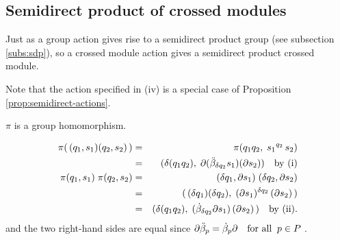 
\subsection{Semidirect product of crossed modules} 
\label{subs:sdp-xmod}

Just as a group action gives rise to a semidirect product group 
(see subsection \ref{subs:sdp}),
so a crossed module action gives a semidirect product crossed module.

Note that the action specified in (iv) is a special case of 
Proposition \ref{prop:semidirect-actions}.

\begin{lem}
$\pi$ is a group homomorphism.
\end{lem}
\begin{pf}
\begin{eqnarray*}
\pi(\,(q_1,s_1)(q_2,s_2)\,)  &  =  &
   \pi( q_1q_2,\; {s_1}^{q_2}\,s_2)  \\
 & = &
   (\delta (q_1 q_2),\; 
      \partial(\ddot{\beta}_{\delta q_2}s_1)(\partial s_2) ) \quad \mbox{by (i)} \\
\pi(q_1,s_1)\;\pi(q_2,s_2)  & = &
   (\delta q_1, \partial s_1)\;(\delta q_2, \partial s_2)  \\
 & = &
   (\,(\delta q_1)(\delta q_2),\;
      (\partial s_1)^{\delta q_2}\,(\partial s_2)\,) \\
 & = &
   (\delta(q_1q_2),\; (\dot{\beta}_{\delta q_2} \partial s_1)\,(\partial s_2)\,)
       \quad \mbox{by (ii)}.
\end{eqnarray*}
and the two right-hand sides are equal since 
$\partial\ddot{\beta}_p = \dot{\beta}_p\partial \quad \mbox{for all} \;\; p \in P\;$.
\end{pf}



